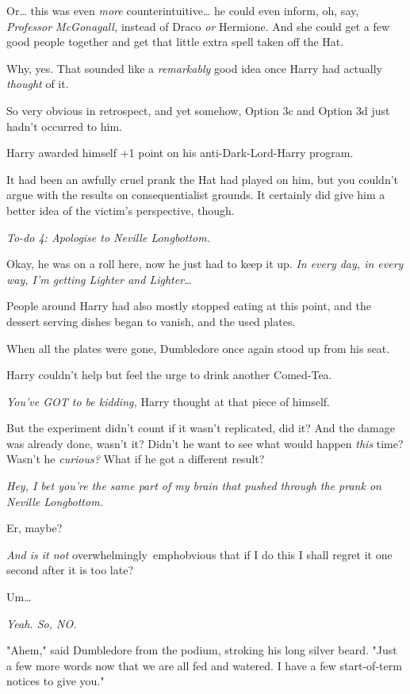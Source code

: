 Or{\ldots} this was even \emph{more} counterintuitive{\ldots} he could even 
inform, oh, say, \emph{Professor McGonagall,} instead of Draco \emph{or} 
Hermione. And she could get a few good people together and get that little 
extra spell taken off the Hat.

Why, yes. That sounded like a \emph{remarkably} good idea once Harry had 
actually \emph{thought} of it.

So very obvious in retrospect, and yet somehow, Option 3c and Option 3d just 
hadn't occurred to him.

Harry awarded himself +1 point on his anti-Dark-Lord-Harry program.

It had been an awfully cruel prank the Hat had played on him, but you couldn't 
argue with the results on consequentialist grounds. It certainly did give him a 
better idea of the victim's perspective, though.

\emph{To-do 4: Apologise to Neville Longbottom.}

Okay, he was on a roll here, now he just had to keep it up. \emph{In every day, 
in every way, I'm getting Lighter and Lighter{\ldots}}

People around Harry had also mostly stopped eating at this point, and the 
dessert serving dishes began to vanish, and the used plates.

When all the plates were gone, Dumbledore once again stood up from his seat.

Harry couldn't help but feel the urge to drink another Comed-Tea.

\emph{You've GOT to be kidding,} Harry thought at that piece of himself.

But the experiment didn't count if it wasn't replicated, did it? And the damage 
was already done, wasn't it? Didn't he want to see what would happen 
\emph{this} time? Wasn't he \emph{curious?} What if he got a different result?

\emph{Hey, I bet you're the same part of my brain that pushed through the prank 
on Neville Longbottom.}

Er, maybe?

\emph{And is it not} overwhelmingly\ emph{obvious that if I do this I shall 
regret it one second after it is too late?}

Um{\ldots}

\emph{Yeah. So, NO.}

"Ahem," said Dumbledore from the podium, stroking his long silver beard. "Just 
a few more words now that we are all fed and watered. I have a few 
start-of-term notices to give you."

